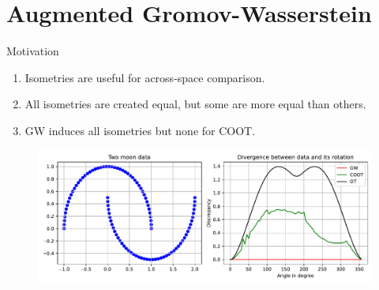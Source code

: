 \documentclass{beamer}
\begin{document}
\section{Augmented Gromov-Wasserstein}

\begin{frame}{Motivation}
\tiny
\begin{enumerate}
  \item Isometries are useful for across-space comparison.
  \item All isometries are created equal, but some are more equal than others.
  \item GW induces all isometries but none for COOT.
\end{enumerate}
\begin{figure}
    \centering
    \includegraphics[width=1.\linewidth, keepaspectratio=true]{OT_new/div_vs_angle.pdf}
\end{figure}
\end{frame}
\end{document}

